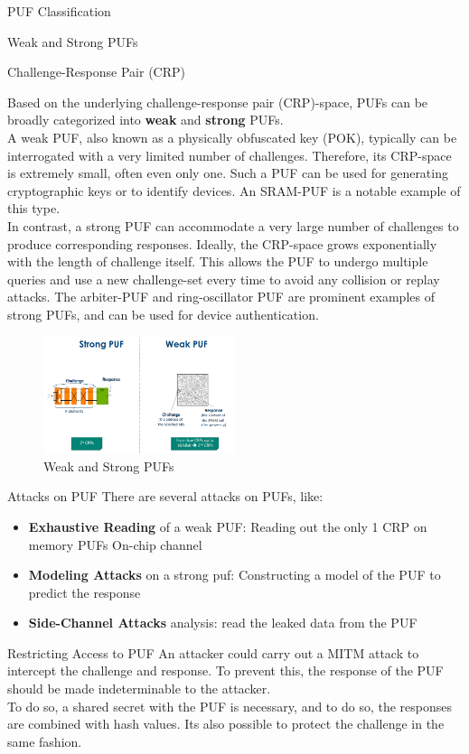 \begin{section}{PUF Classification}
\begin{subsection}{Weak and Strong PUFs}
\begin{paragraph}{Challenge-Response Pair (CRP)}
  \end{paragraph}
  Based on the underlying challenge-response pair (CRP)-space, PUFs can be broadly categorized into
  \textbf{weak} and \textbf{strong} PUFs.\\
  A weak PUF, also known as a physically obfuscated key (POK), typically can be interrogated with a
  very limited number of challenges. Therefore, its CRP-space is extremely small, often even only
  one. Such a PUF can be used for generating cryptographic keys or to identify devices. An SRAM-PUF
  is a notable example of this type.\\
  In contrast, a strong PUF can accommodate a very large number of challenges to produce
  corresponding responses. Ideally, the CRP-space grows exponentially with the length of challenge
  itself. This allows the PUF to undergo multiple queries and use a new challenge-set every time to
  avoid any collision or replay attacks. The arbiter-PUF and ring-oscillator PUF are prominent
  examples of strong PUFs, and can be used for device authentication.
  \begin{figure}
    \centering
    \includegraphics[width=0.5\textwidth]{img/hardware/w-s puf.png}
    \caption{Weak and Strong PUFs}
  \end{figure}
\end{subsection}
\end{section}

\begin{section}{Attacks on PUF}
  There are several attacks on PUFs, like:
  \begin{itemize}
    \item \textbf{Exhaustive Reading} of a weak PUF: Reading out the only 1 CRP on memory PUFs
      On-chip channel
    \item \textbf{Modeling Attacks} on a strong puf: Constructing a model of the PUF to predict the
      response
    \item \textbf{Side-Channel Attacks} analysis: read the leaked data from the PUF
  \end{itemize}
\end{section}
\begin{section}{Restricting Access to PUF}
  An attacker could carry out a MITM attack to intercept the challenge and response. To prevent
  this, the response of the PUF should be made indeterminable to the attacker.\\
  To do so, a shared secret with the PUF is necessary, and to do so, the responses are combined
  with hash values. Its also possible to protect the challenge in the same fashion.
\end{section}
